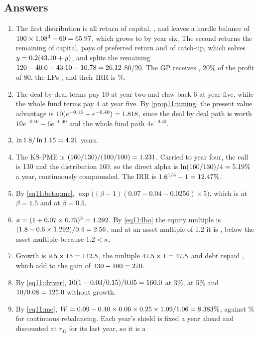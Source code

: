 \begin{chapterrefs}
\subsection*{Answers}
\begin{enumerate}[label=\textbf{11.\arabic*}, leftmargin=*]
  \item The first distribution is all return of capital, \yaRocThree, and leaves a hurdle balance of
  $100\times1.08^3-60=65.97$, which grows to \yaBalSix{} by year six. The second returns the remaining
  \yaRocSix{} of capital, pays \yaPref{} of preferred return and \yaCatch{} of catch-up, which solves
  $y=0.2(43.10+y)$, and splits the remaining $120-40.0-43.10-10.78=26.12$ 80/20. The GP receives \yaGp, 20\% of the profit of 80, the LPs
  \yaLp, and their IRR is \yaLpIrr\%.
  \item The deal by deal terms pay 10 at year two and claw back 6 at year five, while the whole fund terms
  pay 4 at year five. By \cref{prop11:timing}
  the present value advantage is $10(e^{-0.16}-e^{-0.40})=1.818$, since the deal by deal path is worth
  $10e^{-0.16}-6e^{-0.40}$ and the whole fund path $4e^{-0.40}$.
  \item $\ln1.8/\ln1.15=4.21$ years.
  \item The KS-PME is $(160/130)/(100/100)=1.231$. Carried to year four, the call is 130 and the
  distribution 160, so the direct alpha is $\ln(160/130)/4=5.19\%$ a year, continuously compounded. The
  IRR is $1.6^{1/4}-1=12.47\%$.
  \item By \cref{eq11:betapme}, $\exp\bigl((\beta-1)(0.07-0.04-0.0256)\times5\bigr)$, which is \yePme{} at
  $\beta=1.5$ and \yePmeLow{} at $\beta=0.5$.
  \item $\kappa=(1+0.07\times0.75)^5=1.292$. By \cref{eq11:lbo} the equity multiple is
  $(1.8-0.6\times1.292)/0.4=2.56$, and at an asset multiple of 1.2 it is \yfMoicLow, below the asset
  multiple because $1.2<\kappa$.
  \item Growth is $9.5\times15=142.5$, the multiple $47.5\times1=47.5$ and debt repaid \ygD, which add to the
  gain of $430-160=270$.
  \item By \cref{eq11:driver}, $10(1-0.03/0.15)/0.05=160.0$ at 3\%, \yhVhigh{} at 5\% and $10/0.08=125.0$
  without growth.
  \item By \cref{eq11:me}, $W=0.09-0.40\times0.06\times0.25\times1.09/1.06=8.383\%$, against \yiHp\% for continuous
  rebalancing. Each year's shield is fixed a year ahead and discounted at $r_D$ for its last year, so it is a

\end{enumerate}
\end{chapterrefs}
